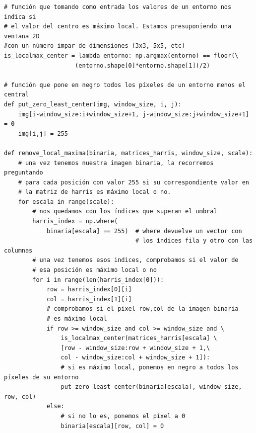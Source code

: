 \documentclass[11pt,a4paper]{article}
\theoremstyle{plain}
\theoremstyle{definition}
\begin{document}
\begin{verbatim}
# función que tomando como entrada los valores de un entorno nos indica si 
# el valor del centro es máximo local. Estamos presuponiendo una ventana 2D 
#con un número impar de dimensiones (3x3, 5x5, etc)
is_localmax_center = lambda entorno: np.argmax(entorno) == floor(\
                    (entorno.shape[0]*entorno.shape[1])/2)

# función que pone en negro todos los píxeles de un entorno menos el central
def put_zero_least_center(img, window_size, i, j):
    img[i-window_size:i+window_size+1, j-window_size:j+window_size+1] = 0
    img[i,j] = 255
    
def remove_local_maxima(binaria, matrices_harris, window_size, scale):
    # una vez tenemos nuestra imagen binaria, la recorremos preguntando 
    # para cada posición con valor 255 si su correspondiente valor en 
    # la matriz de harris es máximo local o no.
    for escala in range(scale):
        # nos quedamos con los índices que superan el umbral
        harris_index = np.where(
            binaria[escala] == 255)  # where devuelve un vector con 
                                     # los índices fila y otro con las columnas
        # una vez tenemos esos indices, comprobamos si el valor de 
        # esa posición es máximo local o no
        for i in range(len(harris_index[0])):
            row = harris_index[0][i]
            col = harris_index[1][i]
            # comprobamos si el pixel row,col de la imagen binaria 
            # es máximo local
            if row >= window_size and col >= window_size and \
                is_localmax_center(matrices_harris[escala] \
                [row - window_size:row + window_size + 1,\
                col - window_size:col + window_size + 1]):
                # si es máximo local, ponemos en negro a todos los píxeles de su entorno
                put_zero_least_center(binaria[escala], window_size, row, col)
            else:
                # si no lo es, ponemos el píxel a 0
                binaria[escala][row, col] = 0
\end{verbatim}
\end{document}
